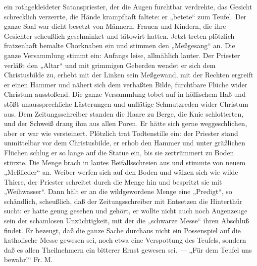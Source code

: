 ein rothgekleideter Satanspriester, der die Augen furchtbar verdrehte, das Gesicht schrecklich verzerrte, die Hände krampfhaft faltete: er „betete“ zum Teufel. Der ganze Saal war dicht besetzt von Männern, Frauen und Kindern, die ihre Gesichter scheußlich geschminket und tätowirt hatten. Jetzt treten plötzlich fratzenhaft bemalte Chorknaben ein und stimmen den „Meßgesang“ an. Die ganze Versammlung stimmt ein: Anfangs leise, allmählich lauter. Der Priester verläßt den „Altar“ und mit grimmigen Geberden wendet er sich dem Christusbilde zu, erhebt mit der Linken sein Meßgewand, mit der Rechten ergreift er einen Hammer und nähert sich dem verhaßten Bilde, furchtbare Flüche wider Christum ausstoßend. Die ganze Versammlung tobet auf in höllischem Haß und stößt unaussprechliche Lästerungen und unflätige Schmutzreden wider Christum aus. Dem Zeitungsschreiber standen die Haare zu Berge, die Knie schlotterten, und der Schweiß drang ihm aus allen Poren. Er hätte sich gerne weggeschlichen, aber er war wie versteinert. Plötzlich trat Todtenstille ein: der Priester stand unmittelbar vor dem Christusbilde, er erhob den Hammer und unter gräßlichen Flüchen schlug er so lange auf die Statue ein, bis sie zertrümmert zu Boden stürzte. Die Menge brach in lautes Beifallsschreien aus und stimmte von neuem „Meßlieder“ an. Weiber werfen sich auf den Boden und wälzen sich wie wilde Thiere, der Priester schreitet durch die Menge hin und bespritzt sie mit „Weihwasser“. Dann hält er an die wildgewordene Menge eine „Predigt“, so schändlich, scheußlich, daß der Zeitungsschreiber mit Entsetzen die Hinterthür sucht: er hatte genug gesehen und gehört, er wollte nicht auch noch Augenzeuge sein der schamlosen Unzüchtigkeit, mit der die „schwarze Messe“ ihren Abschluß findet. Er bezeugt, daß die ganze Sache durchaus nicht ein Possenspiel auf die katholische Messe gewesen sei, noch etwa eine Verspottung des Teufels, sondern daß es allen Theilnehmern ein bitterer Ernst gewesen sei. — „Für dem Teufel uns bewahr!“ Fr. M.
